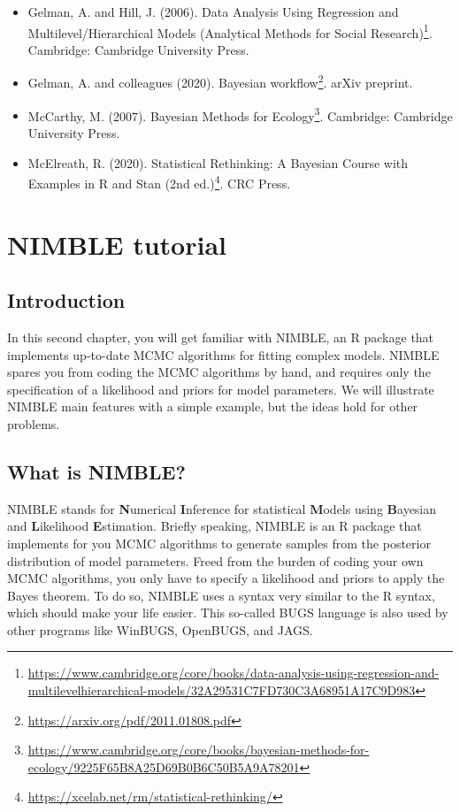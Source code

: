 \documentclass[
  12pt,
]{krantz}
\renewcommand{\href}[2]{#2\footnote{\url{#1}}}
\begin{document}
\begin{itemize}
\item
  Gelman, A. and Hill, J. (2006). \href{https://www.cambridge.org/core/books/data-analysis-using-regression-and-multilevelhierarchical-models/32A29531C7FD730C3A68951A17C9D983}{Data Analysis Using Regression and Multilevel/Hierarchical Models (Analytical Methods for Social Research)}. Cambridge: Cambridge University Press.
\item
  Gelman, A. and colleagues (2020). \href{https://arxiv.org/pdf/2011.01808.pdf}{Bayesian workflow}. arXiv preprint.
\item
  McCarthy, M. (2007). \href{https://www.cambridge.org/core/books/bayesian-methods-for-ecology/9225F65B8A25D69B0B6C50B5A9A78201}{Bayesian Methods for Ecology}. Cambridge: Cambridge University Press.
\item
  McElreath, R. (2020). \href{https://xcelab.net/rm/statistical-rethinking/}{Statistical Rethinking: A Bayesian Course with Examples in R and Stan (2nd ed.)}. CRC Press.
\end{itemize}

\hypertarget{intronimble}{%
\chapter{NIMBLE tutorial}\label{intronimble}}

\hypertarget{introduction-2}{%
\section{Introduction}\label{introduction-2}}

In this second chapter, you will get familiar with NIMBLE, an R package that implements up-to-date MCMC algorithms for fitting complex models. NIMBLE spares you from coding the MCMC algorithms by hand, and requires only the specification of a likelihood and priors for model parameters. We will illustrate NIMBLE main features with a simple example, but the ideas hold for other problems.

\hypertarget{what-is-nimble}{%
\section{What is NIMBLE?}\label{what-is-nimble}}

NIMBLE stands for \textbf{N}umerical \textbf{I}nference for statistical \textbf{M}odels using \textbf{B}ayesian and \textbf{L}ikelihood \textbf{E}stimation. Briefly speaking, NIMBLE is an R package that implements for you MCMC algorithms to generate samples from the posterior distribution of model parameters. Freed from the burden of coding your own MCMC algorithms, you only have to specify a likelihood and priors to apply the Bayes theorem. To do so, NIMBLE uses a syntax very similar to the R syntax, which should make your life easier. This so-called BUGS language is also used by other programs like WinBUGS, OpenBUGS, and JAGS.
\end{document}
